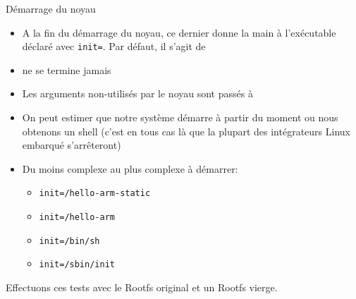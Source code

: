 \begin{frame}[fragile=singleslide]{Démarrage du noyau}
  \begin{itemize}
  \item A  la fin du  démarrage du noyau, ce  dernier donne la  main à
    l'exécutable déclaré  avec \verb+init=+. Par défaut,  il s'agit de
  \item {} ne se termine jamais
  \item  Les  arguments  non-utilisés  par le  noyau  sont  passés  à
  \item On peut  estimer que notre système démarre  à partir du moment
    ou nous obtenons un shell (c'est en tous cas là que la plupart des
    intégrateurs Linux embarqué s'arrêteront)
  \item Du moins complexe au plus complexe à démarrer:
  \begin{itemize}
    \item \verb+init=/hello-arm-static+
    \item \verb+init=/hello-arm+
    \item \verb+init=/bin/sh+
    \item \verb+init=/sbin/init+
    \end{itemize}
  \end{itemize}
  Effectuons ces tests avec le Rootfs original et un Rootfs vierge.
\end{frame}

